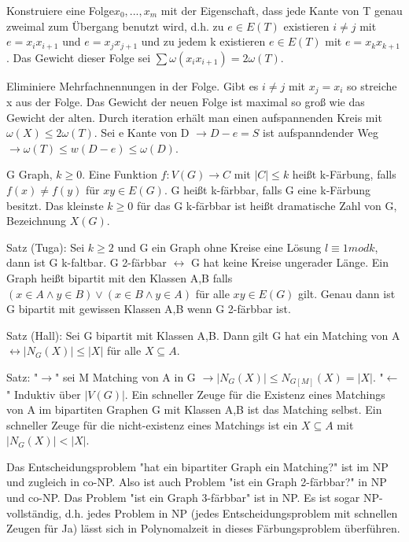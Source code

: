 \documentclass[10pt,landscape]{article}
\begin{document}
\begin{multicols}{3}
Konstruiere eine Folge$x_0,...,x_m$ mit der Eigenschaft, dass jede Kante von T genau zweimal zum Übergang benutzt wird, d.h. zu $e\in E(T)$ existieren $i\not = j$ mit $e=x_i x_{i+1}$ und $e=x_j x_{j+1}$ und zu jedem k existieren $e\in E(T)$ mit $e=x_k x_{k+1}$. Das Gewicht dieser Folge sei $\sum \omega(x_i x_{i+1})= 2\omega(T)$.

Eliminiere Mehrfachnennungen in der Folge. Gibt es $i\not= j$ mit $x_j=x_i$ so streiche x aus der Folge. Das Gewicht der neuen Folge ist maximal so groß wie das Gewicht der alten. Durch iteration erhält man einen aufspannenden Kreis mit $\omega(X) \leq 2 \omega(T)$. Sei e Kante von D $\rightarrow D-e=S$ ist aufspanndender Weg $\rightarrow \omega(T) \leq w(D-e) \leq \omega (D)$.

G Graph, $k\geq 0$. Eine Funktion $f:V(G)\rightarrow C$ mit $|C|\leq k$ heißt k-Färbung, falls $f(x)\not = f(y)$ für $xy\in E(G)$. G heißt k-färbbar, falls G eine k-Färbung besitzt. Das kleinste $k\geq 0$ für das G k-färbbar ist heißt dramatische Zahl von G, Bezeichnung $X(G)$.

Satz (Tuga): Sei $k\geq 2$ und G ein Graph ohne Kreise eine Lösung $l\equiv 1 mod k$, dann ist G k-faltbar. G 2-färbbar $\leftrightarrow$ G hat keine Kreise ungerader Länge. Ein Graph heißt bipartit mit den Klassen A,B falls $(x\in A \wedge y\in B)\vee (x\in B \wedge y\in A)$ für alle $xy \in E(G)$ gilt. Genau dann ist G bipartit mit gewissen Klassen A,B wenn G 2-färbbar ist.

Satz (Hall): Sei G bipartit mit Klassen A,B. Dann gilt G hat ein Matching von A $\leftrightarrow |N_G(X)|\leq |X|$ für alle $X\subseteq A$.

Satz: "$\rightarrow$" sei M Matching von A in G $\rightarrow |N_G(X)| \leq N_{G[M]}(X)=|X|$. "$\leftarrow$" Induktiv über $|V(G)|$.
Ein schneller Zeuge für die Existenz eines Matchings von A im bipartiten Graphen G mit Klassen A,B ist das Matching selbst. Ein schneller Zeuge für die nicht-existenz eines Matchings ist ein $X\subseteq A$ mit $|N_G(X)| < |X|$.

Das Entscheidungsproblem "hat ein bipartiter Graph ein Matching?" ist im NP und zugleich in co-NP. Also ist auch Problem "ist ein Graph 2-färbbar?" in NP und co-NP. Das Problem "ist ein Graph 3-färbbar" ist in NP. Es ist sogar NP-vollständig, d.h. jedes Problem in NP (jedes Entscheidungsproblem mit schnellen Zeugen für Ja) lässt sich in Polynomalzeit in dieses Färbungsproblem überführen.

\end{multicols}
\end{document}
